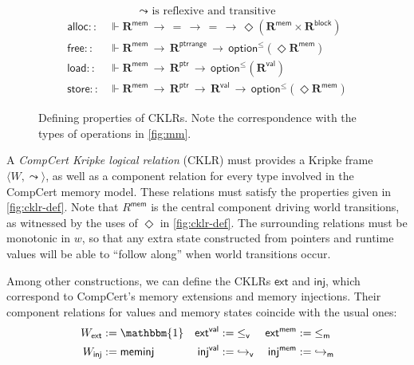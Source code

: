 \documentclass[sigplan,screen,review]{acmart}
\newcommand{\figsize}{\small}
\newcommand{\kw}[1]{\ensuremath{ \mathsf{#1} }}
\newcommand{\vref}{\le_\kw{v}}
\newcommand{\mext}{\le_\kw{m}}
\begin{document}
\begin{figure} %
  \begin{gather*}
    {\leadsto} \mbox{ is reflexive and transitive}
  \end{gather*}
  \begin{align*}
      \kw{alloc} ::
        &\Vdash \mathbf{R}^\kw{mem} \,\rightarrow\, {=} \,\rightarrow\, {=} \,\rightarrow\,
        \Diamond (\mathbf{R}^\kw{mem} \times \mathbf{R}^\kw{block})
      \\
      \kw{free} ::
        &\Vdash \mathbf{R}^\kw{mem} \,\rightarrow\, \mathbf{R}^\kw{ptrrange} \,\rightarrow\,
        \kw{option}^\le(\Diamond \mathbf{R}^\kw{mem})
      \\
      \kw{load} ::
        &\Vdash \mathbf{R}^\kw{mem} \,\rightarrow\, \mathbf{R}^\kw{ptr} \,\rightarrow\,
        \kw{option}^\le(\mathbf{R}^\kw{val})
      \\
      \kw{store} ::
        &\Vdash \mathbf{R}^\kw{mem} \,\rightarrow\, \mathbf{R}^\kw{ptr} \,\rightarrow\,
	\mathbf{R}^\kw{val} \,\rightarrow\,
        \kw{option}^\le(\Diamond \mathbf{R}^\kw{mem})
  \end{align*}
  \caption{Defining properties of CKLRs.
    Note the correspondence with
    the types of operations in \autoref{fig:mm}.}
  \label{fig:cklr-def}
\end{figure}

A \emph{CompCert Kripke logical relation} (CKLR)
must provides a Kripke frame $\langle W, {\leadsto} \rangle$,
as well as a component relation for every type involved
in the CompCert memory model.
These relations must satisfy
the properties given in \autoref{fig:cklr-def}.
Note that $R^\kw{mem}$
is the central component driving world transitions,
as witnessed by the uses of $\Diamond$ in \autoref{fig:cklr-def}.
The surrounding relations must be monotonic in $w$,
so that any extra state
constructed from pointers and runtime values
will be able to ``follow along'' when
world transitions occur.

Among other constructions,
we can define
the CKLRs $\kw{ext}$ and $\kw{inj}$,
which correspond to
CompCert's memory extensions and memory injections.
Their component relations for values and memory states
coincide with the usual ones:
\begin{align*}
  W_\kw{ext} &:= \mathbbm{1} &
  \kw{ext}^\kw{val} &:= {\vref} &
  \kw{ext}^\kw{mem} &:= {\mext} \\
  W_\kw{inj} &:= \kw{meminj} &
  \kw{inj}^\kw{val} &:= {\hookrightarrow_\kw{v}} &
  \kw{inj}^\kw{mem} &:= {\hookrightarrow_\kw{m}}
\end{align*}
\end{document}
